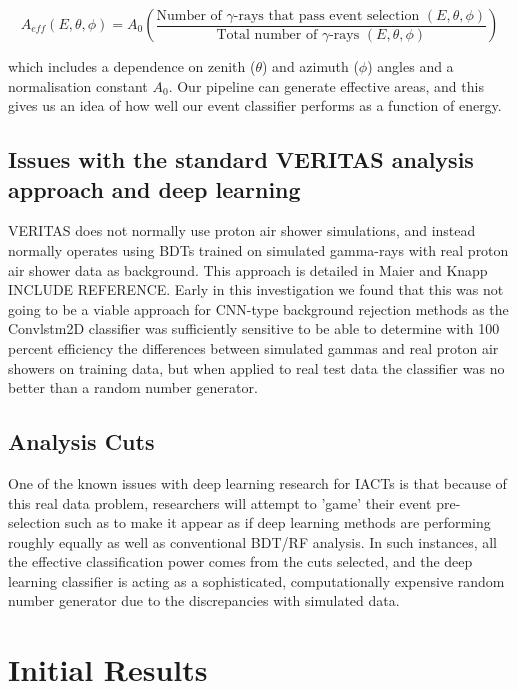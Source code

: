 \begin{equation}
    A_{eff}(E,\theta,\phi)=A_0\left(\frac{\textrm{Number of }\gamma\textrm{-rays that pass event selection }(E,\theta,\phi)}{\textrm{Total number of }\gamma\textrm{-rays }(E,\theta,\phi)}\right)
\end{equation}

which includes a dependence on zenith ($\theta$) and azimuth ($\phi$) angles and a normalisation constant $A_0$. Our pipeline can generate effective areas, and this gives us an idea of how well our event classifier performs as a function of energy.

\subsection{Issues with the standard VERITAS analysis approach and deep learning}
VERITAS does not normally use proton air shower simulations, and instead normally operates using BDTs trained on simulated gamma-rays with real proton air shower data as background. This approach is detailed in Maier and Knapp INCLUDE REFERENCE. Early in this investigation we found that this was not going to be a viable approach for CNN-type background rejection methods as the Convlstm2D classifier was sufficiently sensitive to be able to determine with 100 percent efficiency the differences between simulated gammas and real proton air showers on training data, but when applied to real test data the classifier was no better than a random number generator.
\subsection{Analysis Cuts}
One of the known issues with deep learning research for IACTs is that because of this real data problem, researchers will attempt to 'game' their event pre-selection such as to make it appear as if deep learning methods are performing roughly equally as well as conventional BDT/RF analysis. In such instances, all the effective classification power comes from the cuts selected, and the deep learning classifier is acting as a sophisticated, computationally expensive random number generator due to the discrepancies with simulated data. 

\section{Initial Results}
